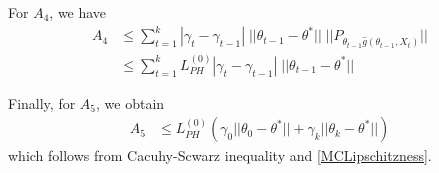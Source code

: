\documentclass[a4paper]{article}
\begin{document}
For $A_{4}$, we have
\begin{equation}
	\begin{split}
		A_{4} & \le \sum_{t = 1}^{k}|\gamma_{t} - \gamma_{t - 1}|\; ||\theta_{t - 1} - \theta^{*}|| \; ||P_{\theta_{t - 1}\hat{g}\left(\theta_{t - 1}, X_{t}\right)}||\\
		& \le \sum_{t = 1}^{k}L_{PH}^{(0)}|\gamma_{t} - \gamma_{t - 1}| \; ||\theta_{t - 1} - \theta^{*}||
	\end{split}
\end{equation}

Finally, for $A_{5}$, we obtain
\begin{equation}
	\begin{split}
		A_{5} & \le L_{PH}^{(0)}\left(\gamma_{0}||\theta_{0} - \theta^{*}|| + \gamma_{k}||\theta_{k} - \theta^{*}||\right)
	\end{split}
\end{equation}
which follows from Cacuhy-Scwarz inequality and \ref{MCLipschitzness}.
\end{document}
